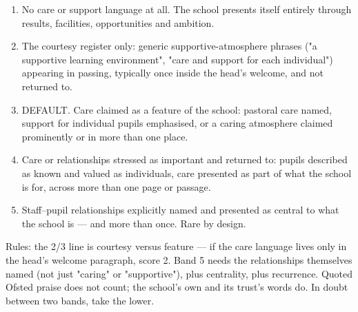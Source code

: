 \begin{enumerate}
  \item No care or support language at all. The school presents itself entirely through results, facilities, opportunities and ambition.
  \item The courtesy register only: generic supportive-atmosphere phrases ("a supportive learning environment", "care and support for each individual") appearing in passing, typically once inside the head's welcome, and not returned to.
  \item DEFAULT. Care claimed as a feature of the school: pastoral care named, support for individual pupils emphasised, or a caring atmosphere claimed prominently or in more than one place.
  \item Care or relationships stressed as important and returned to: pupils described as known and valued as individuals, care presented as part of what the school is for, across more than one page or passage.
  \item Staff--pupil relationships explicitly named and presented as central to what the school is --- and more than once. Rare by design.
\end{enumerate}
Rules: the 2/3 line is courtesy versus feature --- if the care language lives only in the head's welcome paragraph, score 2. Band 5 needs the relationships themselves named (not just "caring" or "supportive"), plus centrality, plus recurrence. Quoted Ofsted praise does not count; the school's own and its trust's words do. In doubt between two bands, take the lower.

